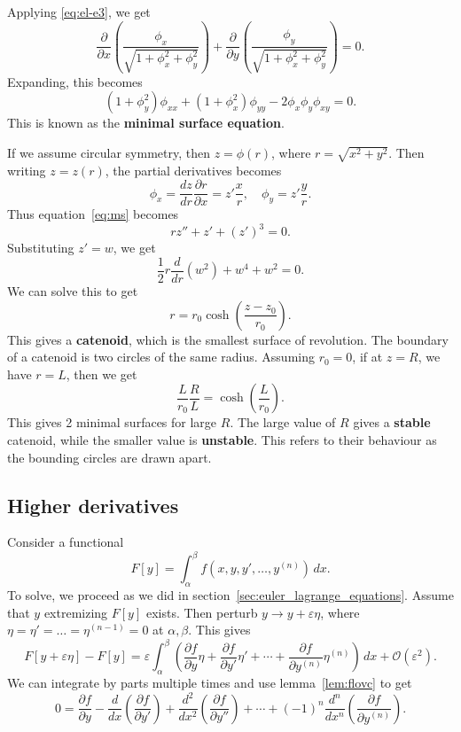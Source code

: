 \documentclass[12pt]{article}
\theoremstyle{definition}
\theoremstyle{remark}
\begin{document}
\begin{adjustbox}{minipage = \columnwidth - 25.5pt, margin=1em, frame=1pt, margin=0em}
	Applying \eqref{eq:el-e3}, we get
	\[
		\frac{\partial}{\partial x} \left( \frac{\phi_x}{\sqrt{1 + \phi_x^2 + \phi_y^2}}\right) + \frac{\partial}{\partial y} \left( \frac{\phi_y}{\sqrt{1 + \phi_x^2 + \phi_y^2}}\right) = 0
	.\]
	Expanding, this becomes
	\[
		(1 + \phi_y^2)\phi_{xx} + (1 + \phi_x^2)\phi_{yy} - 2\phi_x\phi_y\phi_{xy} = 0 \tag{3.5}\label{eq:ms}
	.\]
	This is known as the \textbf{minimal surface equation}.

	If we assume circular symmetry, then $z = \phi(r)$, where $r = \sqrt{x^2 + y^2}$. Then writing $z = z(r)$, the partial derivatives becomes
	\[
	\phi_x = \frac{dz}{dr} \frac{\partial r}{\partial x} = z' \frac{x}{r}, \quad \phi_y = z' \frac{y}{r}
	.\]
	Thus equation~\eqref{eq:ms} becomes
	\[
		rz'' + z' + (z')^3 = 0
	.\]
	Substituting $z' = w$, we get
	\[
		\frac{1}{2} r \frac{d}{dr} (w^2) + w^{4} + w^2 = 0
	.\]
	We can solve this to get
	\[
		r = r_0 \cosh \left( \frac{z - z_0}{r_0} \right)
	.\]
	This gives a \textbf{catenoid}, which is the smallest surface of revolution. The boundary of a catenoid is two circles of the same radius. Assuming $r_0 = 0$, if at $z = R$, we have $r = L$, then we get
	\[
		\frac{L}{r_0} \frac{R}{L} = \cosh \left( \frac{L}{r_0} \right)
	.\]
	This gives 2 minimal surfaces for large $R$. The large value of $R$ gives a \textbf{stable} catenoid, while the smaller value is \textbf{unstable}. This refers to their behaviour as the bounding circles are drawn apart.
\end{adjustbox}

\subsection{Higher derivatives}%
\label{sub:higher_derivatives}

Consider a functional
\[
	F[y] = \int_{\alpha}^{\beta} f(x, y, y', \ldots, y^{(n)})\, dx
.\]
To solve, we proceed as we did in section~\eqref{sec:euler_lagrange_equations}. Assume that $y$ extremizing $F[y]$ exists. Then perturb $y \to y + \varepsilon \eta$, where $\eta = \eta' = \ldots = \eta^{(n-1)} = 0$ at $\alpha, \beta$. This gives
\[
	F[y + \varepsilon \eta] - F[y] = \varepsilon \int_{\alpha}^{\beta} \left( \frac{\partial f}{\partial y} \eta + \frac{\partial f}{\partial y'} \eta' + \cdots + \frac{\partial f}{\partial y^{(n)}} \eta^{(n)} \right)\, dx + \mathcal{O}(\varepsilon^2)
.\]
We can integrate by parts multiple times and use lemma~\eqref{lem:flovc} to get
\[
	0 = \frac{\partial f}{\partial y} - \frac{d}{dx} \left( \frac{\partial f}{\partial y'} \right) + \frac{d^2}{dx^2} \left( \frac{\partial f}{\partial y''} \right) + \cdots + (-1)^{n} \frac{d^{n}}{dx^{n}} \left( \frac{\partial f}{\partial y^{(n)}} \right) \tag{3.6}\label{el-e4}
.\]
\end{document}
